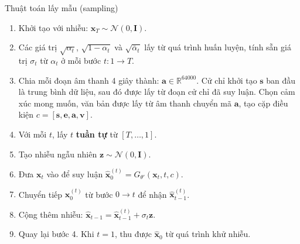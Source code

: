 \begin{algorithm}
	\caption{Thuật toán lấy mẫu (sampling)}
	\begin{enumerate}
		\item Khởi tạo với nhiễu: $\mathbf{x}_T \sim \mathcal{N}(0, \mathbf{I})$.
		
		\item Các giá trị $\sqrt{\alpha_t}$, $\sqrt{1 - \alpha_t}$ và $\sqrt{\bar{\alpha}_t}$ lấy từ quá trình huấn luyện, tính sẵn giá trị $\sigma_t$ từ $\alpha_t$ ở mỗi bước $t: 1 \rightarrow T$.
		
		\item Chia mỗi đoạn âm thanh 4 giây thành: $\mathbf{a} \in \mathbb{R}^{64000}$. Cử chỉ khởi tạo $\mathbf{s}$ ban đầu là trung bình dữ liệu, sau đó được lấy từ đoạn cử chỉ đã suy luận. Chọn cảm xúc mong muốn, văn bản được lấy từ âm thanh chuyển mã $\mathbf{a}$, tạo cặp điều kiện $c = [\mathbf{s}, \mathbf{e}, \mathbf{a}, \mathbf{v}]$.
		
		\item Với mỗi $t$, lấy $t$ \textbf{tuần tự} từ $[T, \dots, 1]$.
		
		\item Tạo nhiễu ngẫu nhiên $\mathbf{z} \sim \mathcal{N}(0, \mathbf{I})$.
		
		\item Đưa $\mathbf{x}_t$ vào để suy luận $\hat{\mathbf{x}}_0^{(t)} = G_{\theta'}(\mathbf{x}_t, t, c)$.
		
		\item Chuyển tiếp $\hat{\mathbf{x}}_0^{(t)}$ từ bước $0 \rightarrow t$ để nhận $\hat{\mathbf{x}}_{t-1}^{(t)}$.
		
		\item Cộng thêm nhiễu: $\hat{\mathbf{x}}_{t-1} = \hat{\mathbf{x}}_{t-1}^{(t)} + \sigma_t \mathbf{z}$.
		
		\item Quay lại bước 4. Khi $t = 1$, thu được $\hat{\mathbf{x}}_0$ từ quá trình khử nhiễu.
	\end{enumerate}
	\label{alg:sampling}
\end{algorithm}

